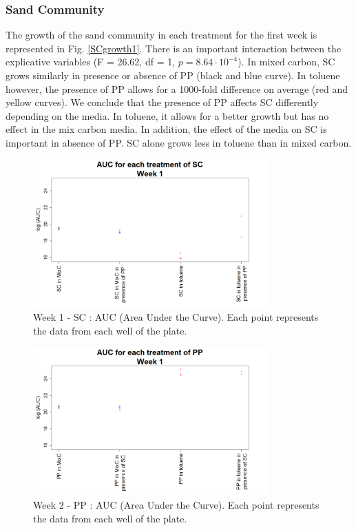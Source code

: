 \documentclass[a4paper, 10pt, conference]{ieeeconf}   %
\begin{document}
\subsubsection{Sand Community}
The growth of the sand community in each treatment for the first week is represented in Fig. \ref{SCgrowth1}.
There is an important interaction between the explicative variables (F = 26.62, df = 1, $p = 8.64\cdot 10 ^{-4}$).
In mixed carbon, SC grows similarly in presence or absence of PP (black and blue curve).
In toluene however, the presence of PP allows for a 1000-fold difference on average (red and yellow curves).
We conclude that the presence of PP affects SC differently depending on the media. In toluene, it allows for a better growth but has no effect in the mix carbon media. In addition, the effect of the media on SC is important in absence of PP. SC alone grows less in toluene than in mixed carbon.\newline
\begin{figure}[H]
	\centering
	\includegraphics[width=9cm]{AUCsc1.png}
	\caption{Week 1 - SC : AUC (Area Under the Curve). Each point represents the data from each well of the plate.}
	\label{aucscw1}
\end{figure}

\begin{figure}[H]
	\centering
	\includegraphics[width=9cm]{AUCpp1.png}
	\caption{Week 2 - PP : AUC (Area Under the Curve). Each point represents the data from each well of the plate.}
	\label{aucppw1}
\end{figure}
\end{document}
